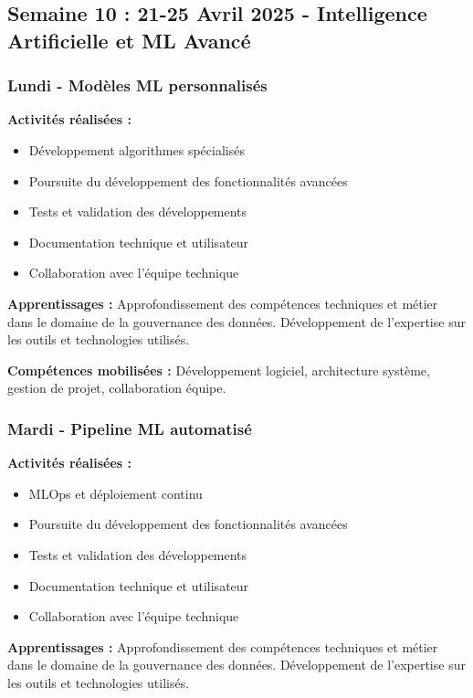 \subsection{Semaine 10 : 21-25 Avril 2025 - Intelligence Artificielle et ML Avancé}

\subsubsection{Lundi - Modèles ML personnalisés}

\textbf{Activités réalisées :}
\begin{itemize}
    \item Développement algorithmes spécialisés
    \item Poursuite du développement des fonctionnalités avancées
    \item Tests et validation des développements
    \item Documentation technique et utilisateur
    \item Collaboration avec l'équipe technique
\end{itemize}

\textbf{Apprentissages :}
Approfondissement des compétences techniques et métier dans le domaine de la gouvernance des données. Développement de l'expertise sur les outils et technologies utilisés.

\textbf{Compétences mobilisées :}
Développement logiciel, architecture système, gestion de projet, collaboration équipe.

\subsubsection{Mardi - Pipeline ML automatisé}

\textbf{Activités réalisées :}
\begin{itemize}
    \item MLOps et déploiement continu
    \item Poursuite du développement des fonctionnalités avancées
    \item Tests et validation des développements
    \item Documentation technique et utilisateur
    \item Collaboration avec l'équipe technique
\end{itemize}

\textbf{Apprentissages :}
Approfondissement des compétences techniques et métier dans le domaine de la gouvernance des données. Développement de l'expertise sur les outils et technologies utilisés.

